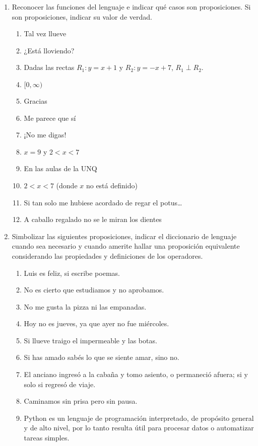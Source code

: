 \documentclass[a4paper]{article}
\newcommand{\exercise}{\item}
\begin{document}
\begin{enumerate}[resume]
	\exercise Reconocer las funciones del lenguaje e indicar qué casos son proposiciones. Si son proposiciones, indicar su valor de verdad.
	\begin{multicols}{2}
	\begin{enumerate} [label=(\alph*)]
		\item Tal vez llueve
		\item ¿Está lloviendo?
		\item Dadas las rectas $R_1: y=x+1$ y $R_2: y=-x+7$, $R_1 \perp R_2$.
		\item $ [ 0, \infty )$
		\item Gracias
		\item Me parece que sí 
		\item ¡No me digas!
		\item $x=9$ y $2 < x < 7$
		\item En las aulas de la UNQ
		\item $2 < x < 7$ (donde $x$ no está definido)
		\item Si tan solo me hubiese acordado de regar el potus…
		\item A caballo regalado no se le miran los dientes 
	\end{enumerate}
	\end{multicols}
	\exercise Simbolizar las siguientes proposiciones, indicar el diccionario de lenguaje cuando sea necesario y cuando amerite hallar una proposición equivalente considerando las propiedades y definiciones de los operadores.
	\begin{multicols}{2}
	\begin{enumerate} [label=(\alph*)]
		\item Luis es feliz, si escribe poemas.
		\item No es cierto que estudiamos y no aprobamos.
		\item No me gusta la pizza ni las empanadas. 
		\item Hoy no es jueves, ya que ayer no fue miércoles.
		\item Si llueve traigo el impermeable y las botas. 
		\item Si has amado sabés lo que se siente amar, sino no. 
		\item El anciano ingresó a la cabaña y tomo asiento, o permaneció afuera; si y solo si regresó de viaje.
		\item Caminamos sin prisa pero sin pausa. 
		\item Python es un lenguaje de programación interpretado, de propósito general y de alto nivel, por lo tanto resulta útil para procesar datos o automatizar tareas simples. 

\end{enumerate}
\end{multicols}
\end{enumerate}
\end{document}
